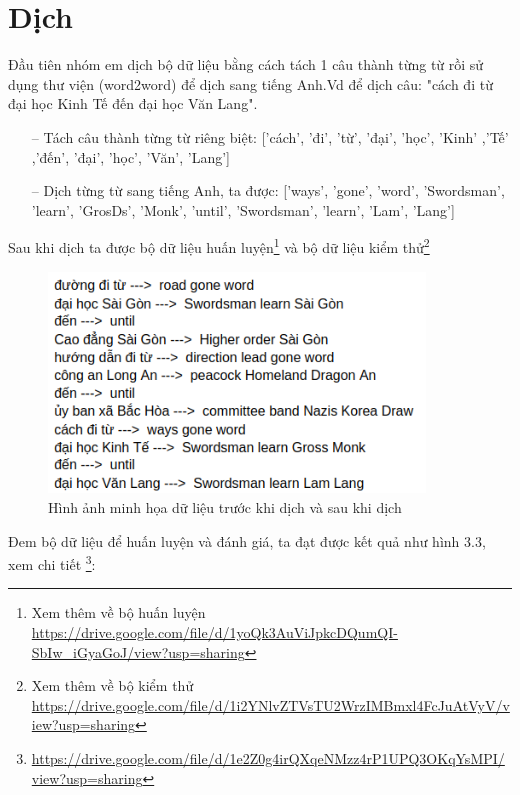 \section{Dịch}

Đầu tiên nhóm em dịch bộ dữ liệu bằng cách tách 1 câu thành từng từ rồi sử dụng thư viện (word2word) để dịch sang tiếng Anh.Vd để dịch câu: "cách đi từ đại học Kinh Tế đến đại học Văn Lang".
\begin{itemize}
    \item[--] Tách câu thành từng từ riêng biệt: ['cách', 'đi', 'từ', 'đại', 'học', 'Kinh' ,'Tế' ,'đến', 'đại', 'học', 'Văn', 'Lang']
    \item[--] Dịch từng từ sang tiếng Anh, ta được: ['ways', 'gone', 'word', 'Swordsman', 'learn', 'GrosDs', 'Monk', 'until', 'Swordsman', 'learn', 'Lam', 'Lang']
\end{itemize}
Sau khi dịch ta được bộ dữ liệu huấn luyện\footnote{Xem thêm về bộ huấn luyện \url{https://drive.google.com/file/d/1yoQk3AuViJpkcDQumQI-SbIw_iGyaGoJ/view?usp=sharing}} và bộ dữ liệu kiểm thử\footnote{Xem thêm về bộ kiểm thử \url{https://drive.google.com/file/d/1i2YNlvZTVsTU2WrzIMBmxl4FcJuAtVyV/view?usp=sharing}}
\begin{figure}[htp]
    \centering
    \includegraphics[width=10cm]{images/trainingdata_dichtungtu.png}
    \caption{Hình ảnh minh họa dữ liệu trước khi dịch và sau khi dịch}
    \label{fig:sodohethongchiduong}
\end{figure}

Đem bộ dữ liệu để huấn luyện và đánh giá, ta đạt được kết quả như hình 3.3, xem chi tiết \footnote{\url{https://drive.google.com/file/d/1e2Z0g4irQXqeNMzz4rP1UPQ3OKqYsMPI/view?usp=sharing}}:

